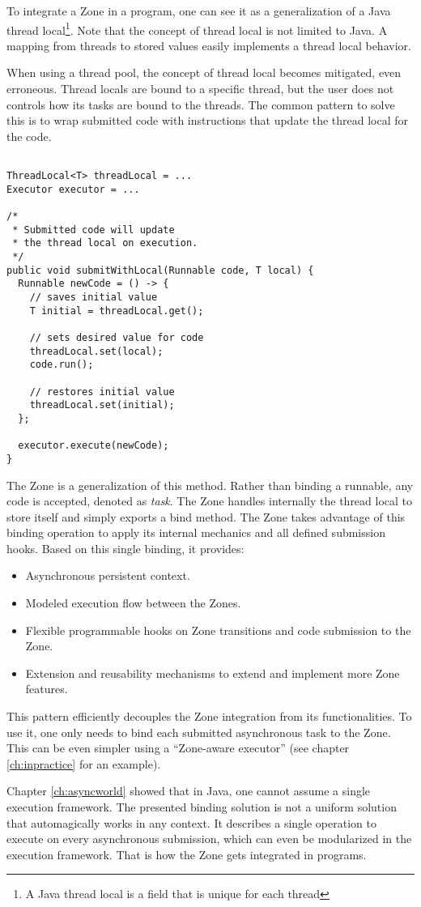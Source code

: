 To integrate a Zone in a program, one can see it as a generalization of a Java thread local\footnote{A Java thread local is a field that is unique for each thread}. Note that the concept of thread local is not limited to Java. A mapping from threads to stored values easily implements a thread local behavior.

When using a thread pool, the concept of thread local becomes mitigated, even erroneous. Thread locals are bound to a specific thread, but the user does not controls how its tasks are bound to the threads. The common pattern to solve this is to wrap submitted code with instructions that update the thread local for the code.
\begin{lstlisting}

ThreadLocal<T> threadLocal = ...
Executor executor = ...

/*
 * Submitted code will update
 * the thread local on execution.
 */
public void submitWithLocal(Runnable code, T local) {
  Runnable newCode = () -> {
    // saves initial value
    T initial = threadLocal.get();

    // sets desired value for code
    threadLocal.set(local);
    code.run();

    // restores initial value
    threadLocal.set(initial);
  };

  executor.execute(newCode);
}
\end{lstlisting}

The Zone is a generalization of this method. Rather than binding a runnable, any code is accepted, denoted as \emph{task}. The Zone handles internally the thread local to store itself and simply exports a bind method.
The Zone takes advantage of this binding operation to apply its internal mechanics and all defined submission hooks. Based on this single binding, it provides:
\begin{itemize}
\item Asynchronous persistent context.
\item Modeled execution flow between the Zones.
\item Flexible programmable hooks on Zone transitions and code submission to the Zone.
\item Extension and reusability mechanisms to extend and implement more Zone features.
\end{itemize}


This pattern efficiently decouples the Zone integration from its functionalities. To use it, one only needs to bind each submitted asynchronous task to the Zone. This can be even simpler using a ``Zone-aware executor'' (see chapter \ref{ch:inpractice} for an example).

Chapter \ref{ch:asyncworld} showed that in Java, one cannot assume a single execution framework. The presented binding solution is not a uniform solution that automagically works in any context. It describes a single operation to execute on every asynchronous submission, which can even be modularized in the execution framework. That is how the Zone gets integrated in programs.
